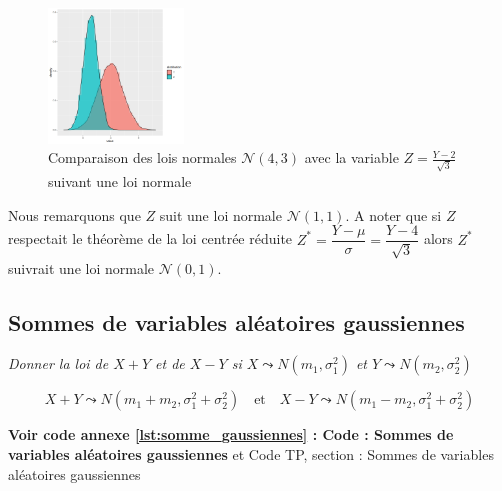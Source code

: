     \begin{figure}[H]
        \centering
        \includegraphics[width=0.32\textwidth]{4_attachments/figures/output29.png}
        \caption{Comparaison des lois normales $\mathcal N(4,3)$ avec la variable $Z=\frac{Y-2}{\sqrt{3}}$ suivant une loi normale}               
        \label{fig:comparaison_loi_normales}
    \end{figure}

    Nous remarquons que $Z$ suit une loi normale $\mathcal{N}(1,1)$. A noter que si $Z$ respectait le théorème de la loi centrée réduite $ Z^{*} = \dfrac{Y-\mu}{\sigma}= \dfrac{Y-4}{\sqrt{3}}$ alors $Z^{*}$ suivrait une loi normale $\mathcal{N}(0,1)$.
    \subsection{Sommes de variables aléatoires gaussiennes}

    \begin{center}
        \textit{Donner la loi de $X+Y$ et de $X-Y$ si $X\leadsto N(m_1,\sigma_1^2)$ et $Y\leadsto N(m_2,\sigma_2^2)$}
    \end{center}
    \begin{equation}
        X+Y\leadsto N(m_1+m_2,\sigma_1^2+\sigma_2^2) \quad \text{et} \quad X-Y\leadsto N(m_1-m_2,\sigma_1^2+\sigma_2^2)
        \label{eq:sommegaussiennes}
    \end{equation}

    \noindent \textbf{Voir code annexe \ref{lst:somme_gaussiennes} : Code : Sommes de variables aléatoires gaussiennes} et Code TP, section : Sommes de variables aléatoires gaussiennes \cite{TP}

